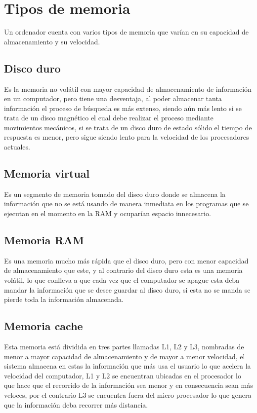 \documentclass{article}
\begin{document}
\section{Tipos de memoria} \label{contenido}


Un ordenador cuenta con varios tipos de memoria que varían en su capacidad de almacenamiento
y su velocidad. 


\subsection{Disco duro }

Es la memoria no volátil con mayor capacidad de almacenamiento de información en un computador, pero tiene una desventaja, al poder almacenar tanta información el proceso de búsqueda es más extenso, siendo aún más lento si se trata de un disco magnético el cual debe realizar el proceso mediante movimientos mecánicos, si se trata de un disco duro de estado sólido el tiempo de respuesta es menor, pero sigue siendo lento para la velocidad de los procesadores actuales. 

\subsection{Memoria virtual }

Es un segmento de memoria tomado del disco duro donde se almacena la información que no se está usando de manera inmediata en los programas que se ejecutan en el momento en la RAM y ocuparían espacio innecesario. 

\subsection{Memoria RAM }

Es una memoria mucho más rápida que el disco duro, pero con menor capacidad de almacenamiento que este, y al contrario del disco duro esta es una memoria volátil, lo que conlleva a que cada vez que el computador se apague esta deba mandar la información que se desee guardar al disco duro, si esta no se manda se pierde toda la información almacenada.   

\subsection{Memoria cache }

Esta memoria está dividida en tres partes llamadas L1, L2 y L3, nombradas de menor a mayor capacidad de almacenamiento y de mayor a menor velocidad, el sistema almacena en estas la información que más usa el usuario lo que acelera la velocidad del computador, L1 y L2 se encuentran ubicadas en el procesador lo que hace que el recorrido de la información sea menor  y en consecuencia sean más veloces, por el contrario L3 se encuentra fuera del micro procesador lo que genera que la información deba recorrer más distancia. 
\end{document}
